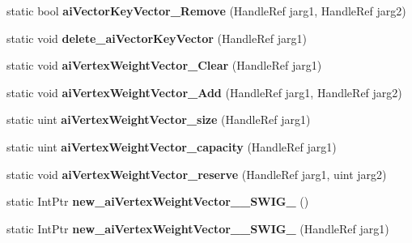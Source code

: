 \begin{DoxyCompactItemize}
\item 
\hypertarget{class_assimp_p_i_n_v_o_k_e_a63f56228a511f3a9fb45525fd8909548}{static bool {\bfseries ai\+Vector\+Key\+Vector\+\_\+\+Remove} (Handle\+Ref jarg1, Handle\+Ref jarg2)}\label{class_assimp_p_i_n_v_o_k_e_a63f56228a511f3a9fb45525fd8909548}

\item 
\hypertarget{class_assimp_p_i_n_v_o_k_e_a0e2e688b1ed415824a9bd85d1b66d562}{static void {\bfseries delete\+\_\+ai\+Vector\+Key\+Vector} (Handle\+Ref jarg1)}\label{class_assimp_p_i_n_v_o_k_e_a0e2e688b1ed415824a9bd85d1b66d562}

\item 
\hypertarget{class_assimp_p_i_n_v_o_k_e_a77d8466126cd08b2a75cc30ec45d1269}{static void {\bfseries ai\+Vertex\+Weight\+Vector\+\_\+\+Clear} (Handle\+Ref jarg1)}\label{class_assimp_p_i_n_v_o_k_e_a77d8466126cd08b2a75cc30ec45d1269}

\item 
\hypertarget{class_assimp_p_i_n_v_o_k_e_adc53e0f5fdac5696cdadc9785c0f42ba}{static void {\bfseries ai\+Vertex\+Weight\+Vector\+\_\+\+Add} (Handle\+Ref jarg1, Handle\+Ref jarg2)}\label{class_assimp_p_i_n_v_o_k_e_adc53e0f5fdac5696cdadc9785c0f42ba}

\item 
\hypertarget{class_assimp_p_i_n_v_o_k_e_a2626d8c422c2ac67daddd1e6a6f2f63c}{static uint {\bfseries ai\+Vertex\+Weight\+Vector\+\_\+size} (Handle\+Ref jarg1)}\label{class_assimp_p_i_n_v_o_k_e_a2626d8c422c2ac67daddd1e6a6f2f63c}

\item 
\hypertarget{class_assimp_p_i_n_v_o_k_e_ae0d7d2ce66d63d60cfc1bd867474da1f}{static uint {\bfseries ai\+Vertex\+Weight\+Vector\+\_\+capacity} (Handle\+Ref jarg1)}\label{class_assimp_p_i_n_v_o_k_e_ae0d7d2ce66d63d60cfc1bd867474da1f}

\item 
\hypertarget{class_assimp_p_i_n_v_o_k_e_a37a7ba60f8a8f31c18ea7d1aa743daec}{static void {\bfseries ai\+Vertex\+Weight\+Vector\+\_\+reserve} (Handle\+Ref jarg1, uint jarg2)}\label{class_assimp_p_i_n_v_o_k_e_a37a7ba60f8a8f31c18ea7d1aa743daec}

\item 
\hypertarget{class_assimp_p_i_n_v_o_k_e_ae41aba1666a1b1ec24428fc1793ac393}{static Int\+Ptr {\bfseries new\+\_\+ai\+Vertex\+Weight\+Vector\+\_\+\+\_\+\+S\+W\+I\+G\+\_} ()}\label{class_assimp_p_i_n_v_o_k_e_ae41aba1666a1b1ec24428fc1793ac393}

\item 
\hypertarget{class_assimp_p_i_n_v_o_k_e_ad6288873e730b79d8e5cf51755cee11f}{static Int\+Ptr {\bfseries new\+\_\+ai\+Vertex\+Weight\+Vector\+\_\+\+\_\+\+S\+W\+I\+G\+\_} (Handle\+Ref jarg1)}\label{class_assimp_p_i_n_v_o_k_e_ad6288873e730b79d8e5cf51755cee11f}


\end{DoxyCompactItemize}
